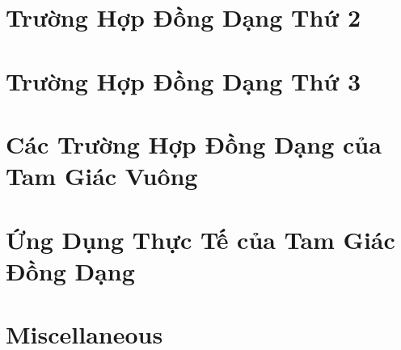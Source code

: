 \documentclass{article}
\begin{document}

\section{Trường Hợp Đồng Dạng Thứ 2}


\section{Trường Hợp Đồng Dạng Thứ 3}


\section{Các Trường Hợp Đồng Dạng của Tam Giác Vuông}


\section{Ứng Dụng Thực Tế của Tam Giác Đồng Dạng}


\section{Miscellaneous}


\printbibliography[heading=bibintoc]
	
\end{document}
